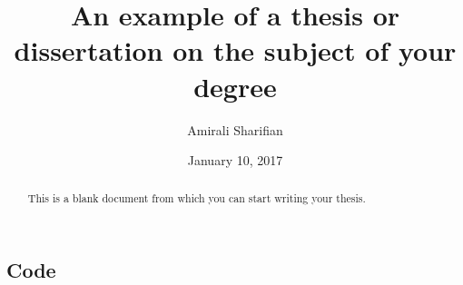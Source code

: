 \documentclass{sfuthesis}
\title{An example of a thesis or dissertation on the subject of your degree}
\author{Amirali Sharifian}
\date{January 10, 2017}
\begin{document}
\frontmatter
\maketitle{}
\makecommittee{}


\begin{abstract}
	This is a blank document from which you can start writing your thesis.
\end{abstract}






%
\tableofcontents%
\clearpage







%
%

\mainmatter%






%
%
%
%
%

\backmatter%
	
	

\begin{appendices} %
	\chapter{Code}
\end{appendices}
\end{document}

